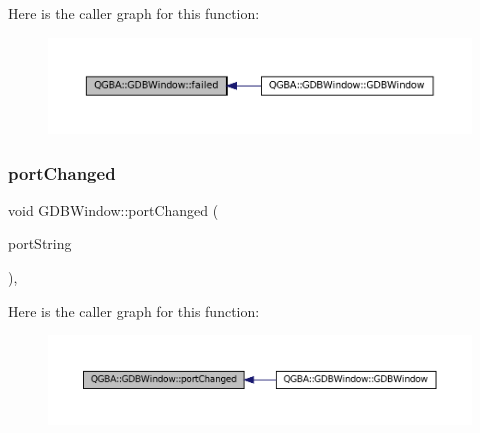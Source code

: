 Here is the caller graph for this function\+:
\nopagebreak
\begin{figure}[H]
\begin{center}
\leavevmode
\includegraphics[width=350pt]{class_q_g_b_a_1_1_g_d_b_window_a52e687877be0300b9b131bd99a48932b_icgraph}
\end{center}
\end{figure}
\mbox{\label{class_q_g_b_a_1_1_g_d_b_window_a1fc6edcafab846d7ab5a34bafa8d36f8}} 
\subsubsection{\texorpdfstring{port\+Changed}{portChanged}}
{\footnotesize\ttfamily void G\+D\+B\+Window\+::port\+Changed (\begin{DoxyParamCaption}\item[{const Q\+String \&}]{port\+String }\end{DoxyParamCaption})\hspace{0.3cm}{\ttfamily [private]}, {\ttfamily [slot]}}

Here is the caller graph for this function\+:
\nopagebreak
\begin{figure}[H]
\begin{center}
\leavevmode
\includegraphics[width=350pt]{class_q_g_b_a_1_1_g_d_b_window_a1fc6edcafab846d7ab5a34bafa8d36f8_icgraph}
\end{center}
\end{figure}
\mbox{\label{class_q_g_b_a_1_1_g_d_b_window_ae3a866cf6616fbf6a7012ac5e8a8abd3}} 
